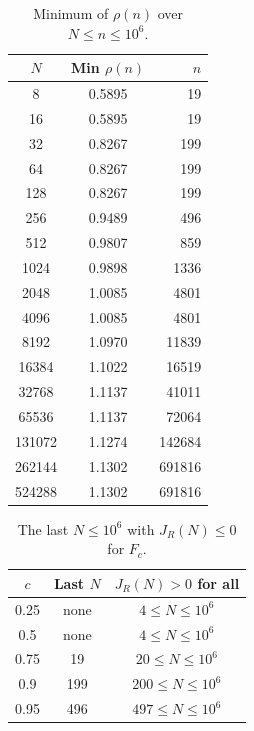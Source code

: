 \documentclass[11pt]{amsart}
\theoremstyle{definition}
\theoremstyle{remark}
\begin{document}
\begin{table}[H]
\caption{Minimum of $\rho(n)$ over $N\leq n\leq 10^6$.}
\label{tab:rhotail}
\small
\begin{tabularx}{\textwidth}{ccr}
\hline
\textbf{$N$} & \textbf{Min $\rho(n)$} & \textbf{$n$} \\
\hline
8 & 0.5895 & 19 \\
16 & 0.5895 & 19 \\
32 & 0.8267 & 199 \\
64 & 0.8267 & 199 \\
128 & 0.8267 & 199 \\
256 & 0.9489 & 496 \\
512 & 0.9807 & 859 \\
1024 & 0.9898 & 1336 \\
2048 & 1.0085 & 4801 \\
4096 & 1.0085 & 4801 \\
8192 & 1.0970 & 11839 \\
16384 & 1.1022 & 16519 \\
32768 & 1.1137 & 41011 \\
65536 & 1.1137 & 72064 \\
131072 & 1.1274 & 142684 \\
262144 & 1.1302 & 691816 \\
524288 & 1.1302 & 691816 \\
\hline
\end{tabularx}
\end{table}
\begin{table}[H]
\caption{The last $N\leq 10^6$ with $J_R(N)\leq 0$ for $F_c$.}
\label{tab:rhoc}
\small
\begin{tabularx}{\textwidth}{ccc}
\hline
\textbf{$c$} & \textbf{Last $N$} & \textbf{$J_R(N)>0$ for all} \\
\hline
0.25 & none & $4\leq N\leq 10^6$ \\
0.5 & none & $4\leq N\leq 10^6$ \\
0.75 & 19 & $20\leq N\leq 10^6$ \\
0.9 & 199 & $200\leq N\leq 10^6$ \\
0.95 & 496 & $497\leq N\leq 10^6$ \\
\hline
\end{tabularx}
\end{table}
\end{document}
